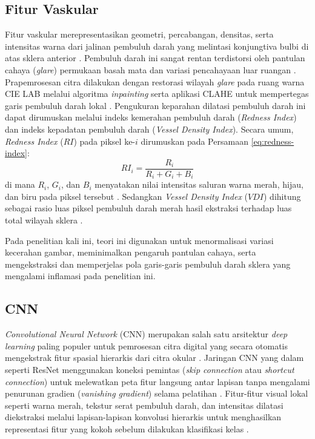 \subsection{Fitur Vaskular}
\label{subsec:fitur-vaskular}

Fitur vaskular merepresentasikan geometri, percabangan, densitas, serta intensitas warna dari jalinan pembuluh darah yang melintasi konjungtiva bulbi di atas sklera anterior \parencite{madhusudhan2026deep}. Pembuluh darah ini sangat rentan terdistorsi oleh pantulan cahaya (\textit{glare}) permukaan basah mata dan variasi pencahayaan luar ruangan \parencite{fuentes2025illumination}. Prapemrosesan citra dilakukan dengan restorasi wilayah \textit{glare} pada ruang warna CIE LAB melalui algoritma \textit{inpainting} serta aplikasi CLAHE untuk mempertegas garis pembuluh darah lokal \parencite{fuentes2025illumination, madhusudhan2026deep}. Pengukuran keparahan dilatasi pembuluh darah ini dapat dirumuskan melalui indeks kemerahan pembuluh darah (\textit{Redness Index}) dan indeks kepadatan pembuluh darah (\textit{Vessel Density Index}). Secara umum, \textit{Redness Index} ($RI$) pada piksel ke-$i$ dirumuskan pada Persamaan \ref{eq:redness-index}:
\begin{equation}
  \label{eq:redness-index}
  RI_i = \frac{R_i}{R_i + G_i + B_i}
\end{equation}
di mana $R_i$, $G_i$, dan $B_i$ menyatakan nilai intensitas saluran warna merah, hijau, dan biru pada piksel tersebut \parencite{madhusudhan2026deep}. Sedangkan \textit{Vessel Density Index} ($VDI$) dihitung sebagai rasio luas piksel pembuluh darah merah hasil ekstraksi terhadap luas total wilayah sklera \parencite{fuentes2025illumination}.

Pada penelitian kali ini, teori ini digunakan untuk menormalisasi variasi kecerahan gambar, meminimalkan pengaruh pantulan cahaya, serta mengekstraksi dan memperjelas pola garis-garis pembuluh darah sklera yang mengalami inflamasi pada penelitian ini.

\subsection{CNN}
\label{subsec:cnn}

\textit{Convolutional Neural Network} (CNN) merupakan salah satu arsitektur \textit{deep learning} paling populer untuk pemrosesan citra digital yang secara otomatis mengekstrak fitur spasial hierarkis dari citra okular \parencite{ali2025automated}. Jaringan CNN yang dalam seperti ResNet menggunakan koneksi pemintas (\textit{skip connection} atau \textit{shortcut connection}) untuk melewatkan peta fitur langsung antar lapisan tanpa mengalami penurunan gradien (\textit{vanishing gradient}) selama pelatihan \parencite{sangeethaa2024enhanced}. Fitur-fitur visual lokal seperti warna merah, tekstur serat pembuluh darah, dan intensitas dilatasi diekstraksi melalui lapisan-lapisan konvolusi hierarkis untuk menghasilkan representasi fitur yang kokoh sebelum dilakukan klasifikasi kelas \parencite{ali2025automated, sangeethaa2024enhanced}.

